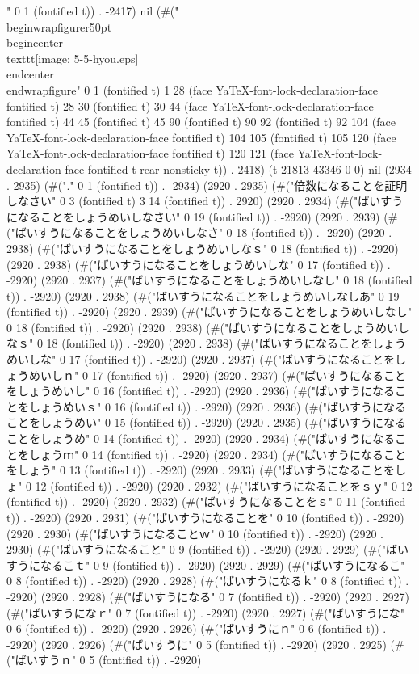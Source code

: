 " 0 1 (fontified t)) . -2417) nil (#("
\\begin{wrapfigure}{r}{50pt}
 \\begin{center}
  \\texttt{[image: 5-5-hyou.eps]}
  \\end{center}
\\end{wrapfigure}" 0 1 (fontified t) 1 28 (face YaTeX-font-lock-declaration-face fontified t) 28 30 (fontified t) 30 44 (face YaTeX-font-lock-declaration-face fontified t) 44 45 (fontified t) 45 90 (fontified t) 90 92 (fontified t) 92 104 (face YaTeX-font-lock-declaration-face fontified t) 104 105 (fontified t) 105 120 (face YaTeX-font-lock-declaration-face fontified t) 120 121 (face YaTeX-font-lock-declaration-face fontified t rear-nonsticky t)) . 2418) (t 21813 43346 0 0) nil (2934 . 2935) (#("." 0 1 (fontified t)) . -2934) (2920 . 2935) (#("倍数になることを証明しなさい" 0 3 (fontified t) 3 14 (fontified t)) . 2920) (2920 . 2934) (#("ばいすうになることをしょうめいしなさい" 0 19 (fontified t)) . -2920) (2920 . 2939) (#("ばいすうになることをしょうめいしなさ" 0 18 (fontified t)) . -2920) (2920 . 2938) (#("ばいすうになることをしょうめいしなｓ" 0 18 (fontified t)) . -2920) (2920 . 2938) (#("ばいすうになることをしょうめいしな" 0 17 (fontified t)) . -2920) (2920 . 2937) (#("ばいすうになることをしょうめいしなし" 0 18 (fontified t)) . -2920) (2920 . 2938) (#("ばいすうになることをしょうめいしなしあ" 0 19 (fontified t)) . -2920) (2920 . 2939) (#("ばいすうになることをしょうめいしなし" 0 18 (fontified t)) . -2920) (2920 . 2938) (#("ばいすうになることをしょうめいしなｓ" 0 18 (fontified t)) . -2920) (2920 . 2938) (#("ばいすうになることをしょうめいしな" 0 17 (fontified t)) . -2920) (2920 . 2937) (#("ばいすうになることをしょうめいしｎ" 0 17 (fontified t)) . -2920) (2920 . 2937) (#("ばいすうになることをしょうめいし" 0 16 (fontified t)) . -2920) (2920 . 2936) (#("ばいすうになることをしょうめいｓ" 0 16 (fontified t)) . -2920) (2920 . 2936) (#("ばいすうになることをしょうめい" 0 15 (fontified t)) . -2920) (2920 . 2935) (#("ばいすうになることをしょうめ" 0 14 (fontified t)) . -2920) (2920 . 2934) (#("ばいすうになることをしょうｍ" 0 14 (fontified t)) . -2920) (2920 . 2934) (#("ばいすうになることをしょう" 0 13 (fontified t)) . -2920) (2920 . 2933) (#("ばいすうになることをしょ" 0 12 (fontified t)) . -2920) (2920 . 2932) (#("ばいすうになることをｓｙ" 0 12 (fontified t)) . -2920) (2920 . 2932) (#("ばいすうになることをｓ" 0 11 (fontified t)) . -2920) (2920 . 2931) (#("ばいすうになることを" 0 10 (fontified t)) . -2920) (2920 . 2930) (#("ばいすうになることｗ" 0 10 (fontified t)) . -2920) (2920 . 2930) (#("ばいすうになること" 0 9 (fontified t)) . -2920) (2920 . 2929) (#("ばいすうになるこｔ" 0 9 (fontified t)) . -2920) (2920 . 2929) (#("ばいすうになるこ" 0 8 (fontified t)) . -2920) (2920 . 2928) (#("ばいすうになるｋ" 0 8 (fontified t)) . -2920) (2920 . 2928) (#("ばいすうになる" 0 7 (fontified t)) . -2920) (2920 . 2927) (#("ばいすうになｒ" 0 7 (fontified t)) . -2920) (2920 . 2927) (#("ばいすうにな" 0 6 (fontified t)) . -2920) (2920 . 2926) (#("ばいすうにｎ" 0 6 (fontified t)) . -2920) (2920 . 2926) (#("ばいすうに" 0 5 (fontified t)) . -2920) (2920 . 2925) (#("ばいすうｎ" 0 5 (fontified t)) . -2920) 